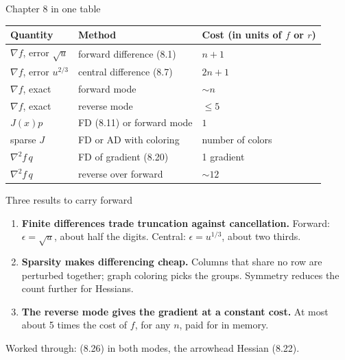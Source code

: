 \documentclass[12pt,aspectratio=169]{beamer}
\newcommand{\eps}{\epsilon}
\begin{document}
\begin{frame}{Chapter 8 in one table}
  \centering
  \renewcommand{\arraystretch}{1.1}
  \begin{tabular}{lll}
    \toprule
    Quantity & Method & Cost (in units of $f$ or $r$)\\
    \midrule
    $\nabla f$, error $\sqrt u$ & forward difference (8.1) & $n+1$\\
    $\nabla f$, error $u^{2/3}$ & central difference (8.7) & $2n+1$\\
    $\nabla f$, exact & forward mode & $\sim n$\\
    $\nabla f$, exact & reverse mode & $\le 5$\\
    $J(x)p$ & FD (8.11) or forward mode & $1$\\
    sparse $J$ & FD or AD with coloring & number of colors\\
    $\nabla^2 f\,q$ & FD of gradient (8.20) & 1 gradient\\
    $\nabla^2 f\,q$ & reverse over forward & $\sim 12$\\
    \bottomrule
  \end{tabular}
\end{frame}

\begin{frame}{Three results to carry forward}
  \begin{enumerate}
    \item \textbf{Finite differences trade truncation against cancellation.}
      Forward: $\eps=\sqrt u$, about half the digits. Central: $\eps=u^{1/3}$, about two thirds.
    \item \textbf{Sparsity makes differencing cheap.}
      Columns that share no row are perturbed together; graph coloring picks the groups.
      Symmetry reduces the count further for Hessians.
    \item \textbf{The reverse mode gives the gradient at a constant cost.}
      At most about 5 times the cost of $f$, for any $n$, paid for in memory.
  \end{enumerate}
  \vspace{1ex}
  Worked through: (8.26) in both modes, the arrowhead Hessian (8.22).
\end{frame}
\end{document}
